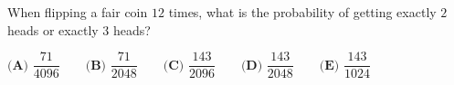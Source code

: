 When flipping a fair coin $12$ times, what is the probability of getting exactly $2$ heads or exactly $3$ heads?

$\textbf{(A) }\dfrac{71}{4096}\qquad\textbf{(B) }\dfrac{71}{2048}\qquad\textbf{(C) }\dfrac{143}{2096}\qquad\textbf{(D) }\dfrac{143}{2048}\qquad\textbf{(E) }\dfrac{143}{1024}$
